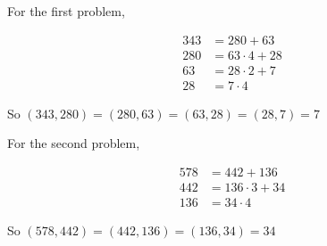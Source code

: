 \documentclass{article}
\theoremstyle{definition}
\begin{document}
  For the first problem,
  
  \begin{align*}
    343 &= 280 + 63 \\
    280 &= 63 \cdot 4 + 28 \\
    63 &= 28 \cdot 2 + 7 \\
    28 &= 7 \cdot 4
  \end{align*}
  
  So $(343, 280) = (280, 63) = (63, 28) = (28, 7) = 7$
  
  For the second problem,
  
  \begin{align*}
    578 &= 442 + 136 \\
    442 &= 136 \cdot 3 + 34 \\
    136 &= 34 \cdot 4
  \end{align*}
  
  So $(578, 442) = (442, 136) = (136, 34) = 34$ 
\end{document}
